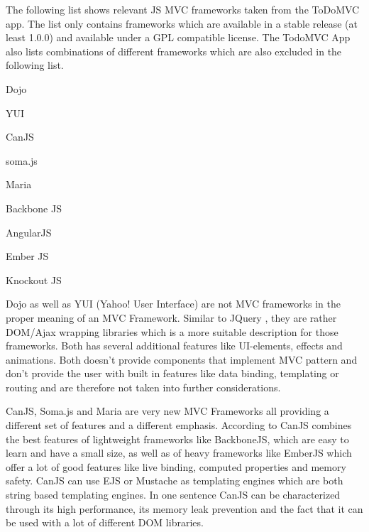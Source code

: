    
The following list shows relevant JS MVC frameworks taken from the ToDoMVC app.
The list only contains frameworks which are available in a stable release (at least 1.0.0) and available under a GPL compatible license.
The TodoMVC App also lists combinations of different frameworks which are also excluded in the following list.\\

\begin{itemize}
\begin{minipage}{0.5\textwidth}

	\item Dojo
	\item YUI
	\item CanJS
	\item soma.js
	\item Maria
\end{minipage}
\begin{minipage}{0.5\textwidth}

	\item Backbone JS
	\item AngularJS
	\item Ember JS
	\item Knockout JS
	\end{minipage}
\end{itemize}


Dojo as well as YUI (Yahoo! User Interface) are not MVC frameworks in the proper meaning of an MVC Framework.
Similar to JQuery , they are rather DOM/Ajax wrapping libraries which is a more suitable description for those frameworks.
Both has several additional features like UI-elements, effects and animations.
Both doesn't provide components that implement MVC pattern and don't provide the user with built in features like data binding, templating or routing and are therefore not taken into further considerations.

CanJS, Soma.js and Maria are very new MVC Frameworks all providing a different set of features and a different emphasis.
According to \autocite{tech-ana:canJS-presentation} CanJS combines the best features of lightweight frameworks like BackboneJS, which are easy to learn and have a small size, as well as of heavy frameworks like EmberJS which offer a lot of good features like live binding, computed properties and memory safety.
CanJS can use EJS or Mustache as templating engines which are both string based templating engines.
In one sentence CanJS can be characterized through its high performance, its memory leak prevention and the fact that it can be used with a lot of different DOM libraries.

